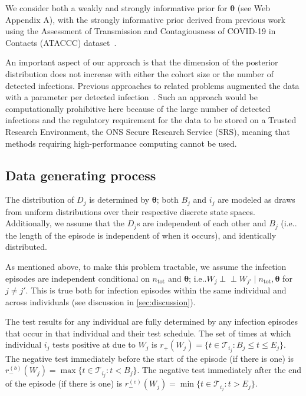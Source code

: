 \documentclass[referee,useAMS,usenatbib]{biom}
\makeatletter
\newcommand{\ind}{\mathrel{\perp\!\!\!\perp}}
\renewcommand{\vec}[1]{\bm{#1}}
\newcommand{\ssep}{:}
\newcommand{\ntot}{n_\text{tot}}
\newcommand{\sched}{\mathcal{T}}
\newcommand{\posResults}{r_{+}}
\newcommand{\negResults}{r_{-}}
\DeclareRobustCommand\onedot{\futurelet\@let@token\@onedot}
\def\@onedot{\ifx\@let@token.\else.\null\fi\xspace}
\def\ie{i.e\onedot} \def\Ie{{I.e}\onedot}
\makeatother
\begin{document}
We consider both a weakly and strongly informative prior for $\vec{\theta}$ (see Web Appendix A), with 
the strongly informative prior derived from previous work~\citep{blakeThesis} using the Assessment of Transmission and Contagiousness of COVID-19 in Contacts (ATACCC) dataset~\citep{hakkiOnset}.


An important aspect of our approach is that the dimension of the posterior distribution does not increase with either the cohort size or the number of detected infections.
Previous approaches to related problems augmented the data with a parameter per detected infection~\citep{heBayesiana,heBayesian,caoModeling}.
Such an approach would be computationally prohibitive here because of the large number of detected infections and the regulatory requirement for the data to be stored on a Trusted Research Environment, the ONS Secure Research Service (SRS), meaning that methods requiring high-performance computing cannot be used.

\subsection{Data generating process}

The distribution of $D_j$ is determined by $\vec{\theta}$; both $B_j$ and $i_j$ are modeled as draws from uniform distributions over their respective discrete state spaces.
Additionally, we assume that the $D_j$s are independent of each other and $B_j$ (\ie the length of the episode is independent of when it occurs), and identically distributed.


As mentioned above, to make this problem tractable, we assume the infection episodes are independent conditional on $\ntot$ and $\vec{\theta}$; \ie $W_j \ind W_{j'} \mid \ntot, \vec{\theta}$ for $j \neq j'$.
This is true both for infection episodes within the same individual and across individuals (see discussion in \cref{sec:discussion}).

The test results for any individual are fully determined by any infection episodes that occur in that individual and their test schedule.
The set of times at which individual $i_j$ tests positive at due to $W_j$ is $\posResults(W_j) = \{ t \in \sched_{i_j} \ssep B_j \leq t \leq E_j \}$.
The negative test immediately before the start of the episode (if there is one) is $\negResults^{(b)}(W_j) = \max \{ t \in \sched_{i_j} \ssep t < B_j \}$.
The negative test immediately after the end of the episode (if there is one) is $\negResults^{(e)}(W_j) = \min \{ t \in \sched_{i_j} \ssep t > E_j \}$.
\end{document}
